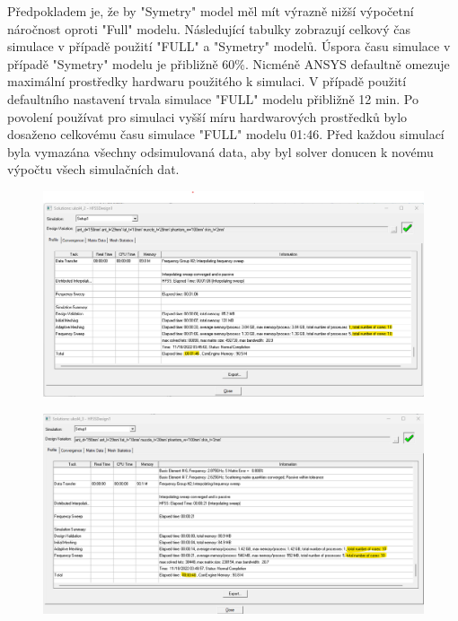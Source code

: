 \documentclass[10pt, a4paper]{article}%
\begin{document}
Předpokladem je, že by "Symetry" model měl mít výrazně nižší výpočetní náročnost oproti "Full" modelu.
Následující tabulky zobrazují celkový čas simulace v případě použití "FULL" a "Symetry" modelů. Úspora
času simulace v případě "Symetry" modelu je přibližně 60\%. Nicméně ANSYS defaultně omezuje
maximální prostředky hardwaru použitého k simulaci. V případě použití defaultního nastavení
trvala simulace "FULL" modelu přibližně 12 min. Po povolení používat pro simulaci vyšší míru hardwarových
prostředků bylo dosaženo celkovému času simulace "FULL" modelu 01:46. Před každou simulací byla vymazána
všechny odsimulovaná data, aby byl solver donucen k novému výpočtu všech simulačních dat.

\begin{figure}[ht!]
	\centering
	\includegraphics[width = 1\textwidth]{elapsed_time_full.png}
\end{figure}
\clearpage

\begin{figure}[ht!]
	\centering
	\includegraphics[width = 1\textwidth]{elapsed_time_symetry.png}
\end{figure}
\end{document}
